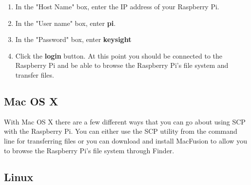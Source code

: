 \documentclass{article}
\begin{document}
\begin{enumerate}[1.)]
			\item In the "Host Name" box, enter the IP address of your Raspberry Pi.
			
			\item In the "User name" box, enter \textbf{pi}.
			
			\item In the "Password" box, enter \textbf{keysight}
			
			\item Click the \textbf{login} button. At this point you should be connected to the Raspberry Pi and be able to browse the Raspberry Pi's file system and transfer files.
			
		\end{enumerate}
	

	
	
	\subsection{Mac OS X}
	
	With Mac OS X there are a few different ways that you can go about using SCP with the Raspberry Pi. You can either use the SCP utility from the command line for transferring files or you can download and install MacFusion to allow you to browse the Raspberry Pi's file system through Finder.
	
	
	\subsection{Linux}






	
	







\end{document}
